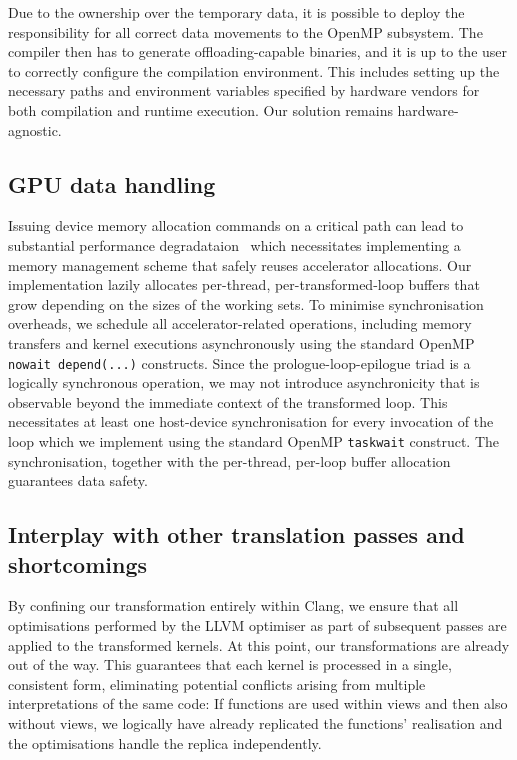 Due to the ownership over the temporary data, it is possible to deploy the responsibility for all correct data movements to the OpenMP subsystem.
The compiler then has to generate offloading-capable binaries, and it is up to the user to correctly configure the compilation environment. 
This includes setting up the necessary paths and environment variables specified by hardware vendors for both compilation and runtime execution.
Our solution remains hardware-agnostic.



\subsection{GPU data handling}

Issuing device memory allocation commands on a critical path can lead to substantial performance degradataion~\cite{Wille:2023:GPU} which necessitates implementing a memory management scheme that safely reuses accelerator allocations. Our implementation lazily allocates per-thread, per-transformed-loop buffers that grow depending on the sizes of the working sets. To minimise synchronisation overheads, we schedule all accelerator-related operations, including memory transfers and kernel executions asynchronously using the standard OpenMP \texttt{nowait depend(...)} constructs. Since the prologue-loop-epilogue triad is a logically synchronous operation, we may not introduce asynchronicity that is observable beyond the immediate context of the transformed loop. This necessitates at least one host-device synchronisation for every invocation of the loop which we implement using the standard OpenMP \texttt{taskwait} construct. The synchronisation, together with the per-thread, per-loop buffer allocation guarantees data safety.

\subsection{Interplay with other translation passes and shortcomings}

By confining our transformation entirely within Clang, we ensure that all optimisations performed by the LLVM optimiser as part of subsequent passes are applied to the transformed kernels. 
At this point, our transformations are already out of the way. 
This guarantees that each kernel is processed in a single, consistent form, eliminating potential conflicts arising from multiple interpretations of the same code:
If functions are used within views and then also without views, we logically have already replicated the functions' realisation and the optimisations handle the replica independently.




